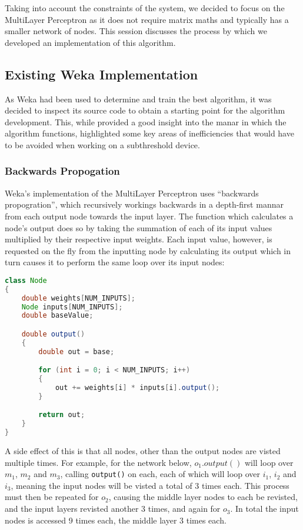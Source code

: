 
Taking into account the constraints of the system, we decided to focus on the MultiLayer Perceptron as it does not require matrix maths and typically has a smaller network of nodes. This session discusses the process by which we developed an implementation of this algorithm.

\subsection{Existing Weka Implementation}

As Weka had been used to determine and train the best algorithm, it was decided to inspect its source code to obtain a starting point for the algorithm development. This, while provided a good insight into the manar in which the algorithm functions, highlighted some key areas of inefficiencies that would have to be avoided when working on a subthreshold device.

\subsubsection{Backwards Propogation}

Weka's implementation of the MultiLayer Perceptron uses ``backwards propogration'', which recursively workings backwards in a depth-first mannar from each output node towards the input layer. The function which calculates a node's output does so by taking the summation of each of its input values multiplied by their respective input weights. Each input value, however, is requested on the fly from the inputting node by calculating its output which in turn causes it to perform the same loop over its input nodes:

\begin{lstlisting}[language=Java,caption={Weka's method of calculating a node's output}]
class Node
{
    double weights[NUM_INPUTS];
    Node inputs[NUM_INPUTS];
    double baseValue;

    double output()
    {
        double out = base;

        for (int i = 0; i < NUM_INPUTS; i++)
        {
            out += weights[i] * inputs[i].output();
        }

        return out;
    }
}
\end{lstlisting}

A side effect of this is that all nodes, other than the output nodes are visted multiple times. For example, for the network below, $o_1.output()$ will loop over $m_1$, $m_2$ and $m_3$, calling \verb|output()| on each, each of which will loop over $i_1$, $i_2$ and $i_3$, meaning the input nodes will be visted a total of 3 times each. This process must then be repeated for $o_2$, causing the middle layer nodes to each be revisted, and the input layers revisted another 3 times, and again for $o_3$. In total the input nodes is accessed 9 times each, the middle layer 3 times each.

